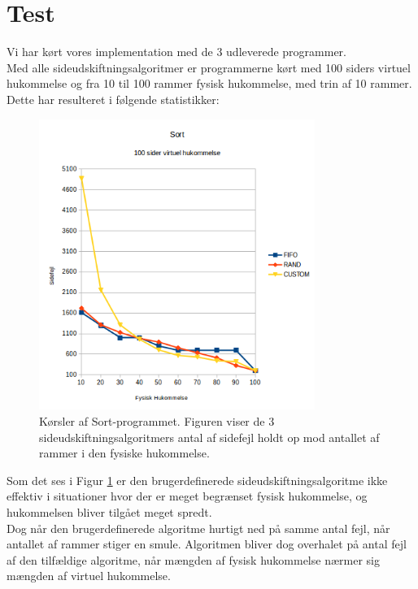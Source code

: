 \section{Test}
Vi har kørt vores implementation med de 3 udleverede programmer.\\

Med alle sideudskiftningsalgoritmer er programmerne kørt med 100 siders virtuel hukommelse og fra 10 til 100 rammer fysisk hukommelse, med trin af 10 rammer. Dette har resulteret i følgende statistikker:

\begin{figure}[H]
	\centering
	\includegraphics[width=0.8\textwidth]{figures/SortStatistic.png}
	\caption{Kørsler af Sort-programmet. Figuren viser de 3 sideudskiftningsalgoritmers antal af sidefejl holdt op mod antallet af rammer i den fysiske hukommelse.}
	\label{fig:sortstatistic}
\end{figure}

Som det ses i Figur \ref{fig:sortstatistic} er den brugerdefinerede sideudskiftningsalgoritme ikke effektiv i situationer hvor der er meget begrænset fysisk hukommelse, og hukommelsen bliver tilgået meget spredt.\\

Dog når den brugerdefinerede algoritme hurtigt ned på samme antal fejl, når antallet af rammer stiger en smule. Algoritmen bliver dog overhalet på antal fejl af den tilfældige algoritme, når mængden af fysisk hukommelse nærmer sig mængden af virtuel hukommelse.\\


